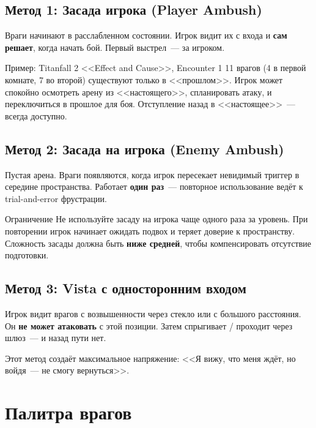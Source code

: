 \documentclass[a4paper,11pt]{report}
\begin{document}
\subsection{Метод 1: Засада игрока (Player Ambush)}

Враги начинают в расслабленном состоянии. Игрок видит их с входа и
\textbf{сам решает}, когда начать бой. Первый выстрел~--- за игроком.

\begin{example}{Пример: Titanfall 2 <<Effect and Cause>>, Encounter 1}
11 врагов (4 в первой комнате, 7 во второй) существуют только в
<<прошлом>>. Игрок может спокойно осмотреть арену из <<настоящего>>,
спланировать атаку, и переключиться в прошлое для боя.
Отступление назад в <<настоящее>>~--- всегда доступно.
\end{example}

\subsection{Метод 2: Засада на игрока (Enemy Ambush)}

Пустая арена. Враги появляются, когда игрок пересекает невидимый
триггер в середине пространства. Работает \textbf{один раз}~--- повторное
использование ведёт к trial-and-error фрустрации.

\begin{warning}{Ограничение}
Не используйте засаду на игрока чаще одного раза за уровень.
При повторении игрок начинает ожидать подвох и теряет доверие к
пространству. Сложность засады должна быть \textbf{ниже средней},
чтобы компенсировать отсутствие подготовки.
\end{warning}

\subsection{Метод 3: Vista с односторонним входом}

Игрок видит врагов с возвышенности через стекло или с большого
расстояния. Он \textbf{не может атаковать} с этой позиции. Затем
спрыгивает / проходит через шлюз~--- и назад пути нет.

Этот метод создаёт максимальное напряжение: <<Я вижу, что меня ждёт,
но войдя~--- не смогу вернуться>>.

\section{Палитра врагов}
\end{document}
